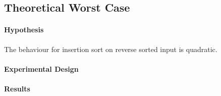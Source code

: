 \documentclass[a4]{article}
\begin{document}




\subsection{Theoretical Worst Case}

\paragraph{Hypothesis} The behaviour for insertion sort on reverse sorted input is quadratic.  


\paragraph{Experimental Design} 









\paragraph{Results} 
\end{document}
